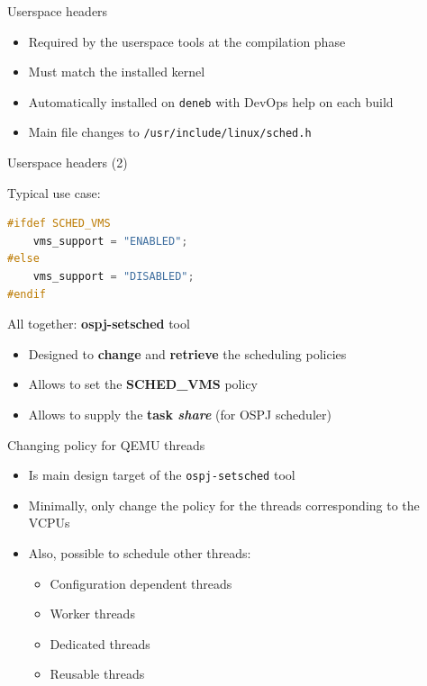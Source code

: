 \begin{frame}{Userspace headers}
    \begin{itemize}
        \item Required by the userspace tools at the compilation phase
        \item Must match the installed kernel
        \item Automatically installed on \texttt{deneb} with DevOps help on each build
        \item Main file changes to \texttt{/usr/include/linux/sched.h}
    \end{itemize}
\end{frame}

\begin{frame}[fragile]{Userspace headers (2)}

Typical use case:

\begin{lstlisting}[language=C]
#ifdef SCHED_VMS
    vms_support = "ENABLED";
#else
    vms_support = "DISABLED";
#endif
\end{lstlisting}
\end{frame}

\begin{frame}{All together: {\ttfamily\bfseries ospj-setsched} tool}
    \begin{itemize}
        \item Designed to \textbf{change} and \textbf{retrieve} the scheduling policies
        \item Allows to set the {\bfseries {\ttfamily SCHED\_VMS}} policy
        \item Allows to supply the {\bfseries task {\itshape share}} (for OSPJ scheduler)
    \end{itemize}
\end{frame}

\begin{frame}{Changing policy for QEMU threads}
    \begin{itemize}
        \item Is main design target of the \texttt{ospj-setsched} tool
        \item Minimally, only change the policy for the threads corresponding to the VCPUs
        \item Also, possible to schedule other threads:
        \begin{itemize}
            \item Configuration dependent threads
            \item Worker threads
            \item Dedicated threads
            \item Reusable threads 
        \end{itemize}
    \end{itemize}
\end{frame}


